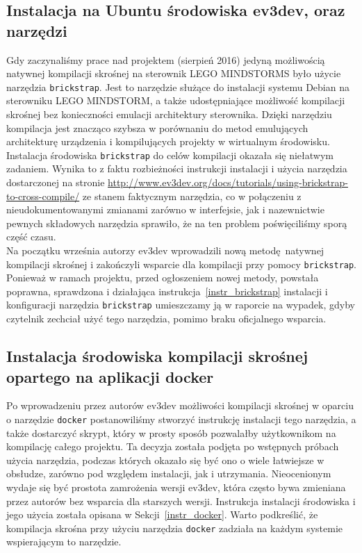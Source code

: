 \documentclass{article}
\begin{document}
\subsection{Instalacja na Ubuntu środowiska ev3dev, oraz narzędzi}
Gdy zaczynaliśmy prace nad projektem (sierpień 2016) jedyną możliwością natywnej
kompilacji skrośnej na sterownik LEGO MINDSTORMS było użycie narzędzia
\texttt{brickstrap}. Jest to narzędzie służące do instalacji systemu Debian na
sterowniku LEGO MINDSTORM, a także udostępniające możliwość kompilacji skrośnej
bez konieczności emulacji architektury sterownika. Dzięki narzędziu kompilacja
jest znacząco szybsza w porównaniu do metod emulujących architekturę urządzenia
i kompilujących projekty w wirtualnym środowisku.\\
Instalacja środowiska \texttt{brickstrap} do celów kompilacji okazała się
niełatwym zadaniem. Wynika to z faktu rozbieżności instrukcji instalacji i
użycia narzędzia dostarczonej na stronie\newline
\url{http://www.ev3dev.org/docs/tutorials/using-brickstrap-to-cross-compile/} ze
stanem faktycznym narzędzia, co w połączeniu z nieudokumentowanymi zmianami
zarówno w interfejsie, jak i nazewnictwie pewnych składowych narzędzia
sprawiło, że na ten problem poświęciliśmy sporą część czasu.\\
Na początku września autorzy ev3dev wprowadzili nową metodę natywnej kompilacji
skrośnej i zakończyli wsparcie dla kompilacji przy pomocy \texttt{brickstrap}.
Ponieważ w ramach projektu, przed ogłoszeniem nowej metody, powstała poprawna,
sprawdzona i działająca instrukcja~\ref{instr_brickstrap}
instalacji i konfiguracji narzędzia \texttt{brickstrap} umieszczamy ją w
raporcie na wypadek, gdyby czytelnik zechciał użyć tego narzędzia, pomimo braku
oficjalnego wsparcia.
\subsection{Instalacja środowiska kompilacji skrośnej opartego na aplikacji
    docker}
Po wprowadzeniu przez autorów ev3dev możliwości kompilacji skrośnej w oparciu o
narzędzie \texttt{docker} postanowiliśmy stworzyć instrukcję instalacji tego
narzędzia, a także dostarczyć skrypt, który w prosty sposób pozwalałby
użytkownikom na kompilację całego projektu. Ta decyzja została podjęta po
wstępnych próbach użycia narzędzia, podczas których okazało się być ono o wiele
łatwiejsze w obsłudze, zarówno pod względem instalacji, jak i utrzymania.
Nieocenionym wydaje się być prostota zamrożenia wersji ev3dev, która często bywa
zmieniana przez autorów bez wsparcia dla starszych wersji. Instrukcja instalacji
środowiska i jego użycia została opisana w Sekcji~\ref{instr_docker}. Warto
podkreślić, że kompilacja skrośna przy użyciu narzędzia \texttt{docker} zadziała
na każdym systemie wspierającym to narzędzie.
\end{document}
